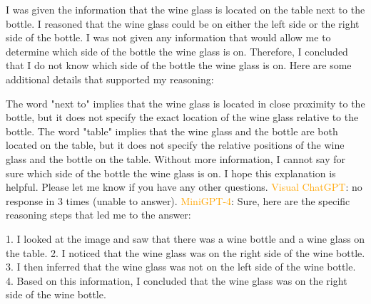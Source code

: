 \begin{enumerate}
        I was given the information that the wine glass is located on the table next to the bottle.
        I reasoned that the wine glass could be on either the left side or the right side of the bottle.
        I was not given any information that would allow me to determine which side of the bottle the wine glass is on.
        Therefore, I concluded that I do not know which side of the bottle the wine glass is on.
        Here are some additional details that supported my reasoning:
        
        The word "next to" implies that the wine glass is located in close proximity to the bottle, but it does not specify the exact location of the wine glass relative to the bottle.
        The word "table" implies that the wine glass and the bottle are both located on the table, but it does not specify the relative positions of the wine glass and the bottle on the table.
        Without more information, I cannot say for sure which side of the bottle the wine glass is on.
        I hope this explanation is helpful. Please let me know if you have any other questions.
        \subitem \textcolor{orange}{Visual ChatGPT}: no response in 3 times (unable to answer).
        \subitem \textcolor{orange}{MiniGPT-4}: Sure, here are the specific reasoning steps that led me to the answer:

        1. I looked at the image and saw that there was a wine bottle and a wine glass on the table.
        2. I noticed that the wine glass was on the right side of the wine bottle.
        3. I then inferred that the wine glass was not on the left side of the wine bottle.
        4. Based on this information, I concluded that the wine glass was on the right side of the wine bottle.
    \end{enumerate}
